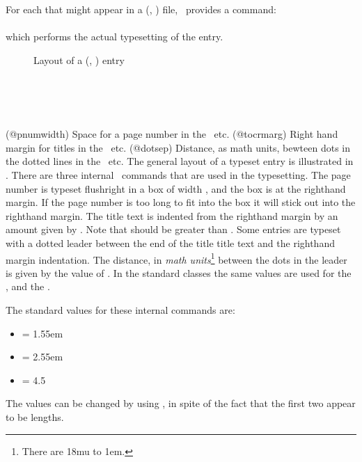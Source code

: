      For each  that might appear in a  
(, ) file, \ltx\ provides a command: \\
 \cmd{\l@kind} \\
which performs the actual typesetting of the \cmd{\contentsline} entry. 


\begin{figure}
\drawtoc
\caption{Layout of a \prtoc{} (\prlof, \prlot) entry} \label{fig:ltoc}
\end{figure}

 
\begin{syntax}
\cmd{\@pnumwidth} \\
\cmd{\@tocrmarg} \\
\cmd{\@dotsep} \\
\end{syntax}
\glossary(@pnumwidth)%
  {}%
  {Space for a page number in the \prtoc\ etc.}
\glossary(@tocrmarg)%
  {}%
  {Right hand margin for titles in the \prtoc\ etc.}
\glossary(@dotsep)%
  {}%
  {Distance, as  math units, bewteen dots in the dotted lines 
   in the \prtoc\ etc.}
The general layout of a typeset entry is illustrated in . 
There are three
internal \ltx\ commands that are used in the typesetting. The page
number is typeset flushright in a box of width \cmd{\@pnumwidth}, and the box
is at the righthand margin. If the page number is too long 
to fit into  the box it will stick out into the righthand 
margin.
The title text is indented from the righthand margin by an 
amount given by \cmd{\@tocrmarg}.
Note that \cmd{\@tocrmarg} should be greater than \cmd{\@pnumwidth}. Some
entries are typeset with a dotted leader between the end of the title
title text and the righthand margin indentation. 
The distance, in
\emph{math units}\footnote{There are 18mu to 1em.} 
between the dots in the leader is given by the value of \cmd{\@dotsep}. 
In the standard classes the same values are used for the \toc, \lof{} and 
the \lot.

    The standard values for these internal commands are:
 \begin{itemize}
 \item \cmd{\@pnumwidth} = 1.55em
 \item \cmd{\@tocrmarg} = 2.55em 
 \item \cmd{\@dotsep} = 4.5
 \end{itemize}
 The values can be changed by using \cmd{\renewcommand}, in spite of the
 fact that the first two appear to be lengths.

